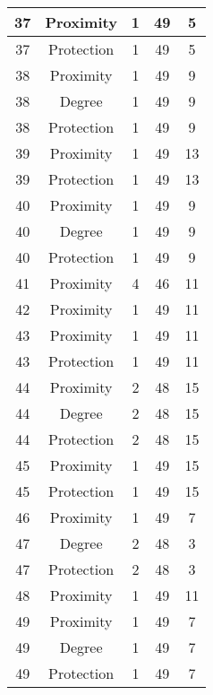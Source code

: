 \documentclass[results.tex]{subfiles}
\begin{document}
\begin{center}
\begin{tabular}{| c || c | c | c | c |}
    37 & Proximity & 1 & 49 & 5 \\ 
    \hline
    37 & Protection & 1 & 49 & 5 \\ 
    \hline
    38 & Proximity & 1 & 49 & 9 \\ 
    \hline
    38 & Degree & 1 & 49 & 9 \\ 
    \hline
    38 & Protection & 1 & 49 & 9 \\ 
    \hline
    39 & Proximity & 1 & 49 & 13 \\ 
    \hline
    39 & Protection & 1 & 49 & 13 \\ 
    \hline
    40 & Proximity & 1 & 49 & 9 \\ 
    \hline
    40 & Degree & 1 & 49 & 9 \\ 
    \hline
    40 & Protection & 1 & 49 & 9 \\ 
    \hline
    41 & Proximity & 4 & 46 & 11 \\ 
    \hline
    42 & Proximity & 1 & 49 & 11 \\ 
    \hline
    43 & Proximity & 1 & 49 & 11 \\ 
    \hline
    43 & Protection & 1 & 49 & 11 \\ 
    \hline
    44 & Proximity & 2 & 48 & 15 \\ 
    \hline
    44 & Degree & 2 & 48 & 15 \\ 
    \hline
    44 & Protection & 2 & 48 & 15 \\ 
    \hline
    45 & Proximity & 1 & 49 & 15 \\ 
    \hline
    45 & Protection & 1 & 49 & 15 \\ 
    \hline
    46 & Proximity & 1 & 49 & 7 \\ 
    \hline
    47 & Degree & 2 & 48 & 3 \\ 
    \hline
    47 & Protection & 2 & 48 & 3 \\ 
    \hline
    48 & Proximity & 1 & 49 & 11 \\ 
    \hline
    49 & Proximity & 1 & 49 & 7 \\ 
    \hline
    49 & Degree & 1 & 49 & 7 \\ 
    \hline
    49 & Protection & 1 & 49 & 7 \\ 
    \hline   \end{tabular}
\end{center}
\end{document}
